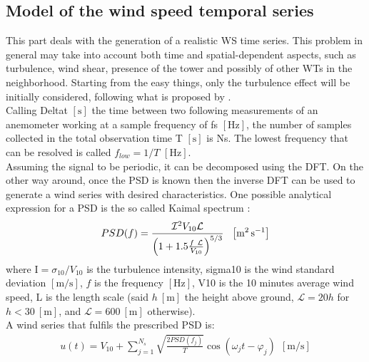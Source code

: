 \subsection[Wind speed temporal series]{Model of the wind speed temporal series}
This part deals with the generation of a realistic \acrshort{WS} time series. This problem in general may take into account both time and spatial-dependent aspects, such as turbulence, wind shear, presence of the tower and possibly of other WTs in the neighborhood. Starting from the easy things, only the turbulence effect will be initially considered, following what is proposed by \cite{Aerodynamics_of_wind_turbines}. \\
Calling \acrshort{Deltat} $\left[\si{\second}\right]$ the time between two following measurements of an anemometer working at a sample frequency of \acrshort{fs} $\left[\si{\hertz}\right]$, the number of samples collected in the total observation time \acrshort{T} $\left[\si{\second}\right]$ is \acrshort{Ns}. The lowest frequency that can be resolved is called $f_{low}=1/T$ $\left[\si{\hertz}\right]$. \\
Assuming the signal to be periodic, it can be decomposed using the \acrfull{DFT}. On the other way around, once the \acrfull{PSD} is known then the inverse \acrshort{DFT} can be used to generate a wind series with desired characteristics. One possible analytical expression for a \acrshort{PSD} is the so called Kaimal spectrum \cite{Aerodynamics_of_wind_turbines}:
\begin{equation}
    PSD(f) = \frac{\mathcal{I} ^2V_{10}\mathcal{L} }{\left(1+1.5\frac{f \ \mathcal{L} }{V_{10}}\right)^{5/3}} \ \ \mesunt{\square \meter \per \second}
    \label{eq:PSD}
\end{equation}
where \acrshort{I}$=\sigma_{10}/V_{10}$ is the turbulence intensity, \acrshort{sigma10} is the wind standard deviation $\left[\si{\meter\per\second}\right]$, $f$ is the frequency $\left[\si{\hertz}\right]$, \acrshort{V10} is the 10 minutes average wind speed, \acrshort{L} is the length scale (said $h \ \left[\si{\meter}\right]$ the height above ground, $\mathcal{L}=20h$ for $h<30 \ \left[\si{\meter}\right]$, and  $\mathcal{L}=600 \ \left[\si{\meter}\right]$ otherwise).\\
A wind series that fulfils the prescribed \acrshort{PSD} is:
\begin{gather}
    u(t) = V_{10}+\sum_{j=1}^{N_s}\sqrt{\frac{2PSD(f_j)}{T}}\cos{(\omega_jt-\varphi_j)} \ \ \left[\si{\meter \per \second}\right]
    \label{eq:wind_series}
\end{gather}
